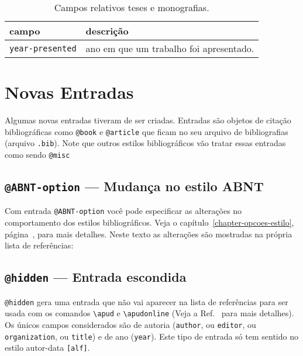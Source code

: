 \documentclass[a4paper]{ltxdoc}
\begin{document}
\begin{table}[htbp]
\begin{center}
\begin{tabular}{lp{8cm}}\hline\hline
campo & descrição \\ \hline
{\tt year-presented} & ano em que um trabalho foi apresentado.
\\ \hline\hline
\end{tabular}
\end{center}
\caption{Campos relativos teses e monografias.}
\label{tabela-campos-teses}
\end{table}


\section{Novas Entradas}

Algumas novas entradas tiveram de ser criadas. Entradas são
objetos de citação bibliográficas como \verb+@book+ e \verb+@article+
que ficam no seu arquivo de bibliografias (arquivo {\tt .bib}).
Note que outros estilos bibliográficos vão tratar essas entradas como
sendo \verb+@misc+

\subsection{{\tt @ABNT-option} --- Mudança no estilo ABNT}

Com entrada {\tt @ABNT-option} você pode especificar as alterações
no comportamento dos estilos bibliográficos.
Veja o capítulo~\ref{chapter-opcoes-estilo},
página~\pageref{chapter-opcoes-estilo}, para mais detalhes.
Neste texto as alterações são mostradas na própria lista de referências:

\subsection{{\tt @hidden} --- Entrada escondida }

{\tt @hidden} gera uma entrada que não vai aparecer na lista de
referências para ser usada com os comandos
\verb+\apud+ e \verb+\apudonline+ (Veja a Ref.~ para
mais detalhes).
Os únicos campos considerados são de autoria ({\tt author}, ou {\tt editor},
ou {\tt organization}, ou {\tt title}) e de ano
({\tt year}). 
Este tipo de entrada só tem sentido no estilo autor-data {\tt [alf]}.
\end{document}
